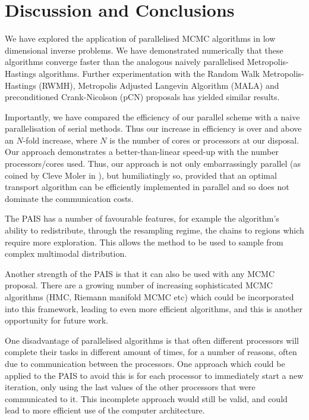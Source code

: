\documentclass[final]{siamltex}
\begin{document}
\section{Discussion and Conclusions}\label{Sec:Conc} 

We have explored the application of parallelised MCMC algorithms in
low dimensional inverse problems. We have demonstrated numerically
that these algorithms converge faster than the analogous naively parallelised
Metropolis-Hastings algorithms. Further experimentation with the
Random Walk Metropolis-Hastings (RWMH), Metropolis Adjusted Langevin
Algorithm (MALA) and preconditioned Crank-Nicolson (pCN) proposals has
yielded similar results\cite{Paul}.%

Importantly, we have compared the efficiency of our parallel scheme
with a naive parallelisation of serial methods. Thus our increase in
efficiency is over and above an $N$-fold increase, where $N$ is the
number of cores or processors at our disposal. Our approach
demonstrates a better-than-linear speed-up with the number
processors/cores used. Thus, our approach is not only embarrassingly
parallel (as coined by Cleve Moler in \cite{moler1986matrix}), but
humiliatingly so, provided that an optimal transport algorithm can be
efficiently implemented in parallel and so does not dominate the
communication costs.

The PAIS has a number of favourable features, for example the
algorithm's ability to redistribute, through the resampling regime,
the chains to regions which require more exploration. This allows the
method to be used to sample from complex multimodal distribution.

Another strength of the PAIS is that it can also be used with any MCMC
proposal. There are a growing number of increasing sophisticated MCMC
algorithms (HMC, Riemann manifold MCMC etc) which could be
incorporated into this framework, leading to even more efficient
algorithms, and this is another opportunity for future work. 

One disadvantage of parallelised algorithms is that often different
processors will complete their tasks in different amount of times, for
a number of reasons, often due to communication between the
processors. One approach which could be applied to the PAIS to avoid
this is for each processor to immediately start a new iteration, only
using the last values of the other processors that were communicated
to it. This incomplete approach would still be valid, and could lead
to more efficient use of the computer architecture.
\end{document}
